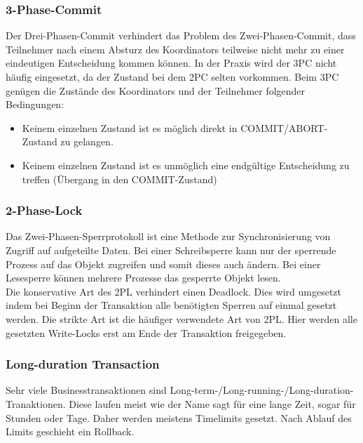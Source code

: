 \documentclass[letterpaper, 12pt]{article}
\let\tempsubsubsection\subsubsection
\renewcommand\subsubsection[1]{\vspace{0cm}\tempsubsubsection{#1}\vspace{0cm}}
\begin{document}
\subsubsection{3-Phase-Commit}

Der Drei-Phasen-Commit verhindert das Problem des Zwei-Phasen-Commit, dass Teilnehmer nach
einem Absturz des Koordinators teilweise nicht mehr zu einer eindeutigen Entscheidung
kommen können. In der Praxis wird der 3PC nicht häufig eingesetzt, da der Zustand bei dem
2PC selten vorkommen. Beim 3PC genügen die Zustände des Koordinators und der Teilnehmer
folgender Bedingungen:

\begin{itemize}
	\item Keinem einzelnen Zustand ist es möglich direkt in COMMIT/ABORT-Zustand zu gelangen.
	\item Keinem einzelnen Zustand ist es unmöglich eine endgültige Entscheidung zu treffen (Übergang
in den COMMIT-Zustand) \cite{ausarbeitungtra}
\end{itemize}

\subsubsection{2-Phase-Lock}

Das Zwei-Phasen-Sperrprotokoll ist eine Methode zur Synchronisierung von Zugriff auf aufgeteilte
Daten. Bei einer Schreibsperre kann nur der sperrende Prozess auf das Objekt zugreifen und somit dieses auch ändern. Bei einer Lesesperre können mehrere Prozesse das gesperrte Objekt lesen. \\
Die konservative Art des 2PL verhindert einen Deadlock. Dies wird umgesetzt indem bei Beginn der Transaktion
alle benötigten Sperren auf einmal gesetzt werden. Die strikte Art ist die häufiger verwendete
Art von 2PL. Hier werden alle gesetzten Write-Locks erst am Ende der Transaktion freigegeben. \cite{ausarbeitungtra}

\subsubsection{Long-duration Transaction}

Sehr viele Businesstransaktionen sind Long-term-/Long-running-/Long-duration-Tranaktionen. Diese
laufen meist wie der Name sagt für eine lange Zeit, sogar für Stunden oder Tage. Daher werden
meistens Timelimits gesetzt. Nach Ablauf des Limits geschieht ein Rollback. \cite{ausarbeitungtra}
\end{document}
